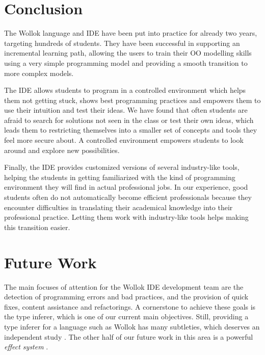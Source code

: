 \section{Conclusion}
\label{sec:conclusion}


The Wollok language and IDE have been put into practice for already two years, targeting hundreds of students.
They have been successful in supporting an incremental learning path, allowing the users to train their OO modelling skills using a very simple programming model and providing a smooth transition to more complex models.


The IDE allows students to program in a controlled environment which helps them not getting stuck, shows best programming practices and empowers them to use their intuition and test their ideas.
We have found that often students are afraid to search for solutions not seen in the class or test their own ideas, 
which leads them to restricting themselves into a smaller set of concepts and tools they feel more secure about.
A controlled environment empowers students to look around and explore new possibilities.

Finally, the IDE provides customized versions of several industry-like tools, helping the students in getting familiarized with the kind of programming environment they will find in actual professional jobs.
In our experience, good students often do not automatically become efficient professionals because they encounter difficulties in translating their academical knowledge into their professional practice.
Letting them work with industry-like tools helps making this transition easier.

\section{Future Work}
\label{sec:furtherWork}
The main focuses of attention for the Wollok IDE development team are the detection of programming errors and bad practices, and the provision of quick fixes, content assistance and refactorings.
A cornerstone to achieve these goals is the type inferer, which is one of our current main objectives.
Still, providing a type inferer for a language such as Wollok has many subtleties, which deserves an independent study \cite{passerini_nicolas_extensible_2014}.
The other half of our future work in this area is a powerful \emph{effect system} \cite{nielson_type_1999}.

